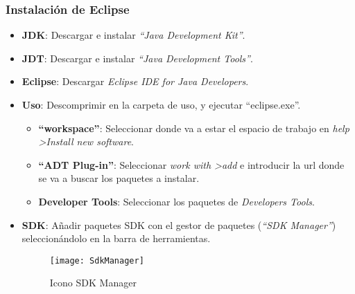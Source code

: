 	\subsubsection{Instalación de Eclipse}
		\begin{itemize}
			\item {\bf JDK}: Descargar e instalar {\it ``Java Development Kit''}\cite{17:jdk:online}.
			\item {\bf JDT}: Descargar e instalar {\it ``Java Development Tools''}\cite{21:jdt:online}.
			\item {\bf Eclipse}: Descargar {\it Eclipse IDE for Java Developers}\cite{15:eclipse:online}.
			\item {\bf Uso}: Descomprimir en la carpeta de uso, y ejecutar ``eclipse.exe''.
			\begin{itemize}
				\item {\bf ``workspace''}: Seleccionar donde va a estar el espacio de trabajo en {\it help \textgreater Install new software}.
				\item {\bf ``ADT Plug-in''}: Seleccionar {\it work with \textgreater add} e introducir la url donde se va a buscar los paquetes a instalar.
				\item {\bf Developer Tools}: Seleccionar los paquetes de {\it Developers Tools}.
			\end{itemize}
			\item {\bf SDK}: Añadir paquetes SDK con el gestor de paquetes ({\em ``SDK Manager''}) seleccionándolo en la barra de herramientas.
			\begin{figure}[h]
				\centering
				\texttt{[image: SdkManager]}
				\caption{Icono SDK Manager}
				\label{fig:SdkManager}
			\end{figure}
		\end{itemize}
	
